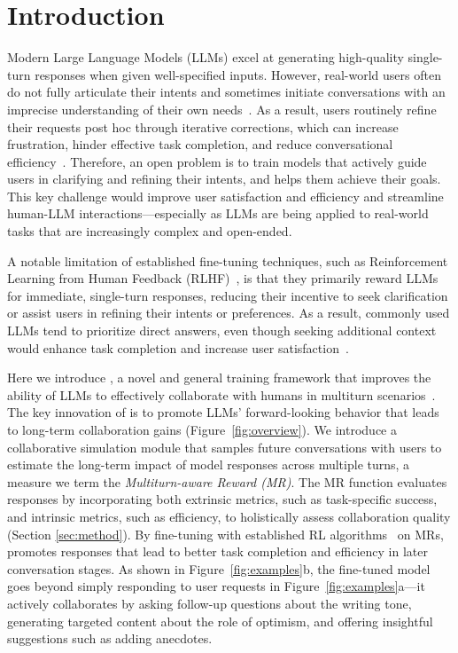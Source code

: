 \section{Introduction}

Modern Large Language Models (LLMs) excel at generating high-quality single-turn responses when given well-specified inputs. 
However, real-world users often do not fully articulate their intents and sometimes initiate conversations with an imprecise understanding of their own needs~\cite{taylor:1968}.
As a result, users routinely refine their requests post hoc through iterative corrections, which can increase frustration, hinder effective task completion, and reduce conversational efficiency~\cite{guidelines, johnny,understand_user_experience,dissatisfaction}. 
Therefore, an open problem is to train models that actively guide users in clarifying and refining their intents, and helps them achieve their goals.
This key challenge would improve user satisfaction and efficiency and streamline human-LLM interactions---especially as LLMs are being applied to real-world tasks that are increasingly complex and open-ended.

A notable limitation of established fine-tuning techniques, such as Reinforcement Learning from Human Feedback (RLHF)~\citep{rlhf}, is that they primarily reward LLMs for immediate, single-turn responses, reducing their incentive to seek clarification or assist users in refining their intents or preferences. 
As a result, commonly used LLMs tend to prioritize direct answers, even though seeking additional context would enhance task completion and increase user satisfaction~\cite{dissatisfaction}.

Here we introduce {\bf \name{}}, a novel and general training framework that improves the ability of LLMs to effectively collaborate with humans in multiturn scenarios~\citep{neural_approach, rethinking_conv_agent, clarify_survey}. 
The key innovation of \name{} is to promote LLMs' forward-looking behavior that leads to long-term collaboration gains (Figure~\ref{fig:overview}). 
We introduce a collaborative simulation module that samples future conversations with users to estimate the long-term impact of model responses across multiple turns, a measure we term the \textit{Multiturn-aware Reward (MR)}. 
The MR function evaluates responses by incorporating both extrinsic metrics, such as task-specific success, and intrinsic metrics, such as efficiency, to holistically assess collaboration quality (\cf Section \ref{sec:method}).
By fine-tuning with established RL algorithms~\citep{dpo, ppo} on MRs, \name{} promotes responses that lead to better task completion and efficiency in later conversation stages.
As shown in Figure~\ref{fig:examples}b, the fine-tuned model goes beyond simply responding to user requests in Figure~\ref{fig:examples}a---it actively collaborates by asking follow-up questions about the writing tone, generating targeted content about the role of optimism, and offering insightful suggestions such as adding anecdotes. 

